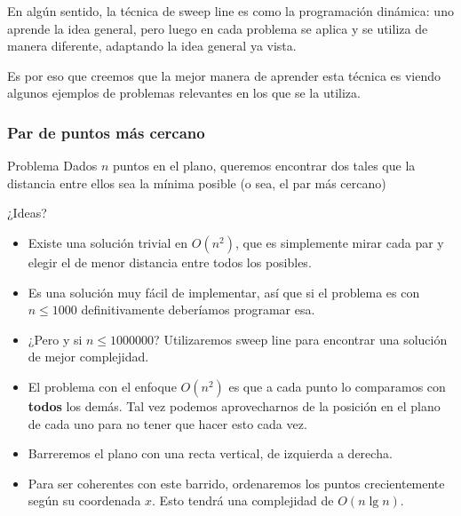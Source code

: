 \documentclass[compress]{beamer}
\begin{document}
\begin{frame}
En alg\'un sentido, la t\'ecnica de sweep line es como la programaci\'on din\'amica: uno aprende la idea general, pero luego en cada problema se aplica y se utiliza de manera diferente, adaptando la idea general ya vista.
\bigskip

Es por eso que creemos que la mejor manera de aprender esta t\'ecnica es viendo algunos ejemplos de problemas relevantes en los que se la utiliza.
\end{frame}

\subsubsection{Par de puntos m\'as cercano}

\begin{frame}
\begin{block}{Problema}
Dados $n$ puntos en el plano, queremos encontrar dos tales que la distancia entre ellos sea la m\'inima posible (o sea, el par m\'as cercano)
\end{block}
\bigskip
¿Ideas? \pause 
{}
\end{frame}

\begin{frame}
\begin{itemize}
\item Existe una soluci\'on trivial en $O(n^2)$, que es simplemente mirar cada par y elegir el de menor distancia entre todos los posibles.
\bigskip

\item Es una soluci\'on muy f\'acil de implementar, as\'i que si el problema es con $n \leq 1000$ definitivamente deber\'iamos programar esa.
\bigskip

\item ¿Pero y si $n\leq 1000000$? Utilizaremos sweep line para encontrar una soluci\'on de mejor complejidad.
\end{itemize}
\end{frame}

\begin{frame}
\begin{itemize}
\item El problema con el enfoque $O(n^2)$ es que a cada punto lo comparamos con \textbf{todos} los dem\'as. 
Tal vez podemos aprovecharnos de la posici\'on en el plano de cada uno para no tener que hacer esto cada vez.
\bigskip
\item Barreremos el plano con una recta vertical, de izquierda a derecha.
\bigskip
\item Para ser coherentes con este barrido, ordenaremos los puntos crecientemente seg\'un su coordenada $x$. 
Esto tendr\'a una complejidad de $O(n \lg n)$.
\end{itemize}
\end{frame}
\end{document}
